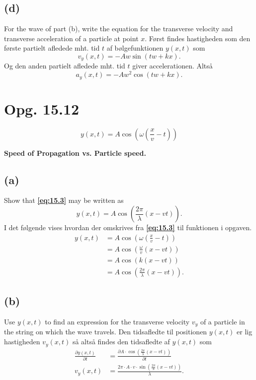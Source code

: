\documentclass[12pt]{article}
\theoremstyle{definition}
\begin{document}
\subsection*{(d)}
For the wave of part (b), write the equation for the transverse velocity and transverse acceleration of a particle at point $x$.
\bigbreak
Først findes hastigheden som den første partielt afledede mht. tid $t$ af bølgefunktionen $y(x,t)$ som
\[ 
v_y(x,t) = -A w \sin\left(t w + k x\right)
.\]
Og den anden partielt afledede mht. tid $t$ giver accelerationen. Altså
\[ 
a_y (x,t) = -A w^{2} \cos\left(t w + k x\right)
.\]


\section*{Opg. 15.12}
\begin{equation} \label{eq:15.3}
  y(x,t) = A \cos \left( \omega \left( \frac{x}{v} - t \right) \right)
\end{equation}

\textbf{Speed of Propagation vs. Particle speed.}


\subsection*{(a)}
Show that \textbf{\autoref{eq:15.3}} may be written as
\[ 
y(x,t) = A \cos \left( \frac{2\pi}{\lambda}(x-vt) \right)
.\]
I det følgende vises hvordan der omskrives fra \textbf{\autoref{eq:15.3}} til funktionen i opgaven.
\begin{align*}
  y(x,t) &= A \cos \left( \omega \left( \frac{x}{v} - t \right) \right) \\ 
    &= A \cos \left( \frac{\omega}{v} \left( x-vt \right) \right) \\
    &= A \cos \left( k(x-vt) \right) \\
    &= A \cos \left( \frac{2\pi}{\lambda}(x-vt) \right)
.\end{align*}


\subsection*{(b)}
Use $y(x,t)$ to find an expression for the transverse velocity $v_y$ of a particle in the string on which the wave travels. 
\bigbreak
Den tidsafledte til positionen $y(x,t)$ er lig hastigheden $v_y(x,t)$ så altså findes den tidsafledte af $y(x,t)$ som
\begin{align*}
  \frac{\partial y(x,t)}{\partial t} &= \frac{\partial A \cdot \cos \left( \frac{2\pi}{\lambda}(x-vt) \right)}{\partial t} \\
  v_y(x,t) &= \frac{2\pi \cdot A\cdot v\cdot \sin \left( \frac{2\pi}{\lambda}(x - vt) \right)  }{\lambda}
.\end{align*}
\end{document}
